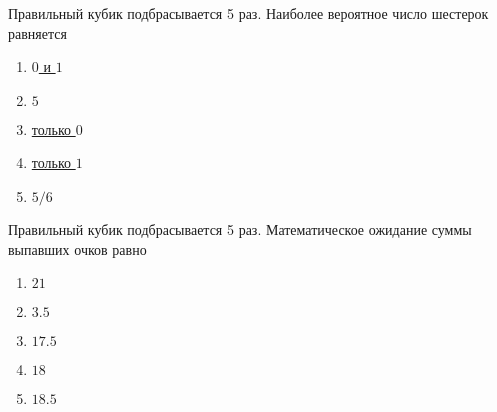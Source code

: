 \documentclass[t]{beamer}
\begin{document}
 \begin{frame} \label{24} 
\begin{block}{24} 

  Правильный кубик подбрасывается 5 раз. Наиболее вероятное число шестерок равняется
  


 \end{block} 
\begin{enumerate} 
\item[] \hyperlink{24-Yes}{\beamergotobutton{} $0$ и $1$}
\item[] \hyperlink{24-No}{\beamergotobutton{} $5$}
\item[] \hyperlink{24-No}{\beamergotobutton{} только $0$}
\item[] \hyperlink{24-No}{\beamergotobutton{} только $1$}
\item[] \hyperlink{24-No}{\beamergotobutton{} $5/6$}
\end{enumerate} 
\end{frame} 


 \begin{frame} \label{25} 
\begin{block}{25} 

  Правильный кубик подбрасывается 5 раз. Математическое ожидание суммы выпавших очков равно
  


 \end{block} 
\begin{enumerate} 
\item[] \hyperlink{25-No}{\beamergotobutton{} $21$}
\item[] \hyperlink{25-No}{\beamergotobutton{} $3.5$}
\item[] \hyperlink{25-Yes}{\beamergotobutton{} $17.5$}
\item[] \hyperlink{25-No}{\beamergotobutton{} $18$}
\item[] \hyperlink{25-No}{\beamergotobutton{} $18.5$}
\end{enumerate} 
\end{frame} 
\end{document}
